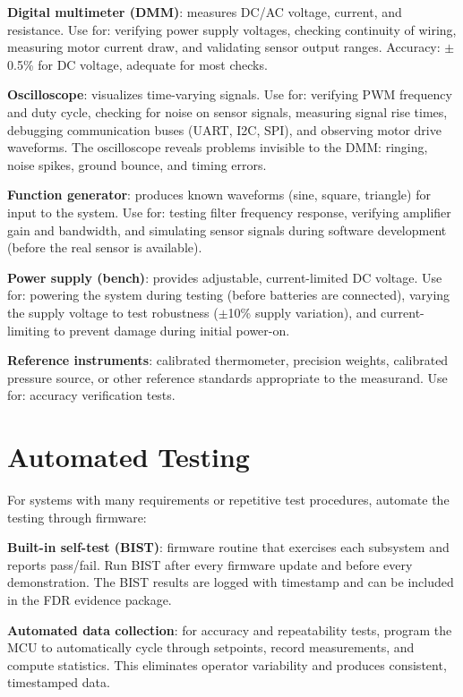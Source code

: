 \textbf{Digital multimeter (DMM)}: measures DC/AC voltage, current, and resistance. Use for: verifying power supply voltages, checking continuity of wiring, measuring motor current draw, and validating sensor output ranges. Accuracy: $\pm$0.5\% for DC voltage, adequate for most checks.

\textbf{Oscilloscope}: visualizes time-varying signals. Use for: verifying PWM frequency and duty cycle, checking for noise on sensor signals, measuring signal rise times, debugging communication buses (UART, I2C, SPI), and observing motor drive waveforms. The oscilloscope reveals problems invisible to the DMM: ringing, noise spikes, ground bounce, and timing errors.

\textbf{Function generator}: produces known waveforms (sine, square, triangle) for input to the system. Use for: testing filter frequency response, verifying amplifier gain and bandwidth, and simulating sensor signals during software development (before the real sensor is available).

\textbf{Power supply (bench)}: provides adjustable, current-limited DC voltage. Use for: powering the system during testing (before batteries are connected), varying the supply voltage to test robustness ($\pm$10\% supply variation), and current-limiting to prevent damage during initial power-on.

\textbf{Reference instruments}: calibrated thermometer, precision weights, calibrated pressure source, or other reference standards appropriate to the measurand. Use for: accuracy verification tests.

\section{Automated Testing}
For systems with many requirements or repetitive test procedures, automate the testing through firmware:

\textbf{Built-in self-test (BIST)}: firmware routine that exercises each subsystem and reports pass/fail. Run BIST after every firmware update and before every demonstration. The BIST results are logged with timestamp and can be included in the FDR evidence package.

\textbf{Automated data collection}: for accuracy and repeatability tests, program the MCU to automatically cycle through setpoints, record measurements, and compute statistics. This eliminates operator variability and produces consistent, timestamped data.

